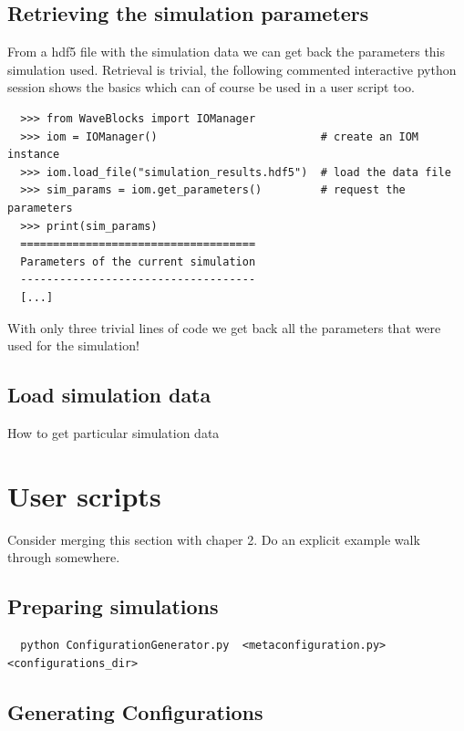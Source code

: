 \documentclass[a4paper,10pt]{report}
\begin{document}
\subsection{Retrieving the simulation parameters}

From a hdf5 file with the simulation data we can get back the parameters this
simulation used. Retrieval is trivial, the following commented interactive python
session shows the basics which can of course be used in a user script too.

\begin{verbatim}
  >>> from WaveBlocks import IOManager
  >>> iom = IOManager()                         # create an IOM instance
  >>> iom.load_file("simulation_results.hdf5")  # load the data file
  >>> sim_params = iom.get_parameters()         # request the parameters
  >>> print(sim_params)
  ====================================
  Parameters of the current simulation
  ------------------------------------
  [...]
\end{verbatim}

With only three trivial lines of code we get back all the parameters
that were used for the simulation!

\subsection{Load simulation data}

How to get particular simulation data


\section{User scripts}

Consider merging this section with chaper 2.
Do an explicit example walk through somewhere.

\subsection{Preparing simulations}

\begin{verbatim}
  python ConfigurationGenerator.py  <metaconfiguration.py> <configurations_dir>
\end{verbatim}


\subsection{Generating Configurations}
\end{document}
